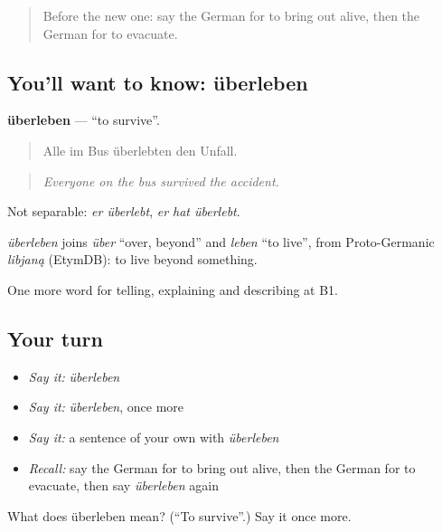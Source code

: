 \label{lesson:GE-C292-ueberleben}



\begin{quote}
Before the new one: say the German for to bring out alive, then the German for to evacuate.
\end{quote}

\subsection*{You'll want to know: überleben}
\textbf{überleben} — \textquotedblleft{}to survive\textquotedblright{}.

\begin{quote}
Alle im Bus überlebten den Unfall.
\end{quote}

\begin{quote}
\emph{Everyone on the bus survived the accident.}
\end{quote}

Not separable: \emph{er überlebt}, \emph{er hat überlebt}.

\begin{cousinweb}
\emph{überleben} joins \emph{über} \textquotedblleft{}over, beyond\textquotedblright{} and \emph{leben} \textquotedblleft{}to live\textquotedblright{}, from Proto-Germanic \emph{libjaną} (EtymDB): to live beyond something.
\end{cousinweb}

\begin{grammarlens}[title={What you've built}]
One more word for telling, explaining and describing at B1.
\end{grammarlens}

\subsection*{Your turn}
\begin{itemize}
\raggedright
  \item \emph{Say it:} \emph{überleben}
  \item \emph{Say it:} \emph{überleben}, once more
  \item \emph{Say it:} a sentence of your own with \emph{überleben}
  \item \emph{Recall:} say the German for to bring out alive, then the German for to evacuate, then say \emph{überleben} again
\end{itemize}

\begin{tcolorbox}[breakable,colback=teal!4,colframe=teal!35!black,title={Before you move on}]
What does überleben mean? (\textquotedblleft{}To survive\textquotedblright{}.) Say it once more.
\end{tcolorbox}
